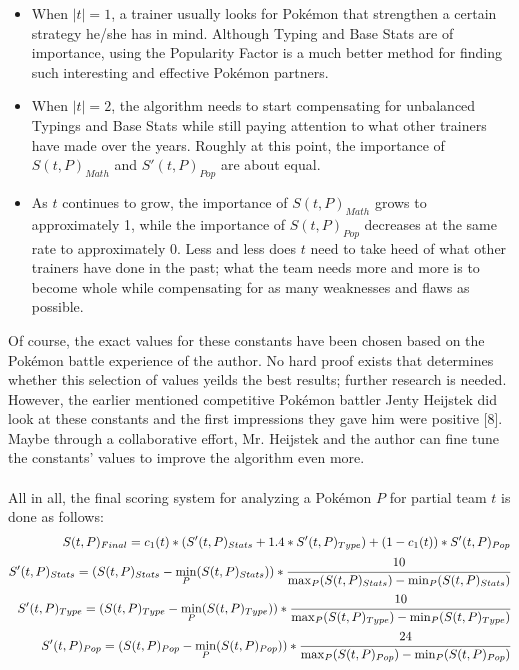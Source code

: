 \documentclass{article}
\begin{document}
\begin{itemize}
	\item When $|t|=1$, a trainer usually looks for Pok\'emon that strengthen a certain strategy he/she has in mind. Although Typing and Base Stats are of importance, using the Popularity Factor is a much better method for finding such interesting and effective Pok\'emon partners.
	\item When $|t|=2$, the algorithm needs to start compensating for unbalanced Typings and Base Stats while still paying attention to what other trainers have made over the years. Roughly at this point, the importance of $S(t,P)_{Math}$ and $S'(t,P)_{Pop}$ are about equal.
	\item As $t$ continues to grow, the importance of $S(t,P)_{Math}$ grows to approximately 1, while the importance of $S(t,P)_{Pop}$ decreases at the same rate to approximately 0. Less and less does $t$ need to take heed of what other trainers have done in the past; what the team needs more and more is to become whole while compensating for as many weaknesses and flaws as possible.
\end{itemize}
Of course, the exact values for these constants have been chosen based on the Pok\'emon battle experience of the author. No hard proof exists that determines whether this selection of values yeilds the best results; further research is needed. However, the earlier mentioned competitive Pok\'emon battler Jenty Heijstek did look at these constants and the first impressions they gave him were positive [8]. Maybe through a collaborative effort, Mr. Heijstek and the author can fine tune the constants' values to improve the algorithm even more.\\\\
All in all, the final scoring system for analyzing a Pok\'emon $P$ for partial team $t$ is done as follows:
\begin{eqnarray*}
	S(t,P)_{Final}=c_1(t)*(S'(t,P)_{Stats}+1.4*S'(t,P)_{Type})+(1-c_1(t))*S'(t,P)_{Pop}\\
	S'(t,P)_{Stats}=(S(t,P)_{Stats}-\min_P(S(t,P)_{Stats}))*\cfrac{10}{\max_P(S(t,P)_{Stats})-\min_P(S(t,P)_{Stats})}\\
	S'(t,P)_{Type}=(S(t,P)_{Type}-\min_P(S(t,P)_{Type}))*\cfrac{10}{\max_P(S(t,P)_{Type})-\min_P(S(t,P)_{Type})}\\
	S'(t,P)_{Pop}=(S(t,P)_{Pop}-\min_P(S(t,P)_{Pop}))*\cfrac{24}{\max_P(S(t,P)_{Pop})-\min_P(S(t,P)_{Pop})}
\end{eqnarray*}
\end{document}
